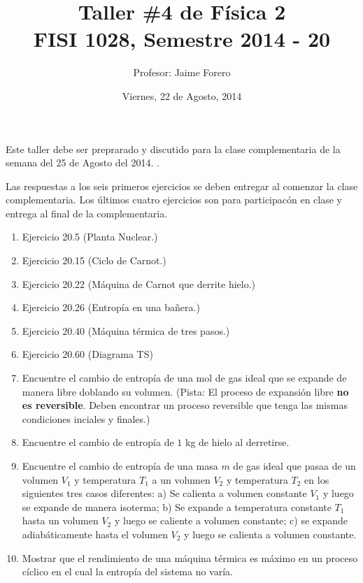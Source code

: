 \documentclass{article}
\title{Taller \#4 de F\'isica 2\\ FISI 1028, Semestre 2014 - 20}
\author{Profesor: Jaime Forero}
\date{Viernes, 22 de Agosto, 2014}
\begin{document}
\maketitle
\thispagestyle{empty}

\noindent
Este taller debe ser preprarado y discutido para la clase
complementaria de la semana del 25 de Agosto del 2014. .

Las respuestas a los seis primeros ejercicios se deben entregar al comenzar la
clase complementaria. Los \'ultimos cuatro ejercicios son para
participac\'on en clase y entrega al final de la complementaria. 

\begin{enumerate}


\item
Ejercicio 20.5 (Planta Nuclear.)

\item
Ejercicio 20.15 (Ciclo de Carnot.)

\item 
Ejercicio 20.22 (Máquina de Carnot que derrite hielo.)

\item 
Ejercicio 20.26 (Entropía en una bañera.)

\item 
Ejercicio 20.40 (Máquina térmica de tres pasos.)

\item 
Ejercicio 20.60 (Diagrama TS)

\item 
Encuentre el cambio de entrop\'ia de una mol de gas ideal que se expande de manera libre doblando su volumen. (Pista: El proceso de expansi\'on libre {\bf no es reversible}. Deben encontrar un proceso reversible que tenga las mismas condiciones inciales y finales.)

\item
Encuentre el cambio de entropía de $1$ kg de hielo al derretirse.

\item
Encuentre el cambio de entropía de una masa $m$ de gas ideal que pasaa de un volumen $V_1$ y temperatura $T_1$ a un volumen $V_2$ y temperatura $T_2$ en los siguientes tres casos diferentes: a) Se calienta a volumen constante $V_1$ y luego se expande de manera isoterma; b) Se expande a temperatura constante $T_1$ hasta un volumen $V_2$ y luego se caliente a volumen constante; c) se expande adiabáticamente hasta el volumen $V_2$ y luego se calienta a volumen constante.

\item
Mostrar que el rendimiento de una máquina térmica es máximo en un proceso cíclico en el cual la entropía del sistema no varía.

\end{enumerate}
\end{document}
